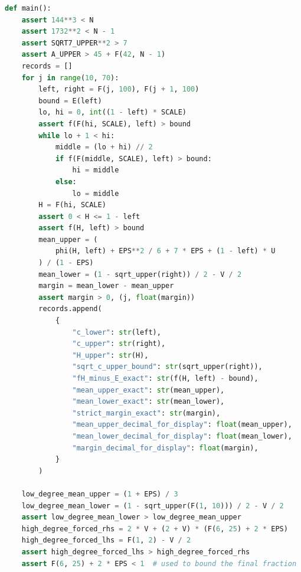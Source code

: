 \documentclass[11pt,a4paper]{article}
\theoremstyle{remark}
\numberwithin{equation}{section}
\begin{document}
\begin{lstlisting}[language=Python]
def main():
    assert 144**3 < N
    assert 1732**2 < N - 1
    assert SQRT7_UPPER**2 > 7
    assert A_UPPER > 45 + F(42, N - 1)
    records = []
    for j in range(10, 70):
        left, right = F(j, 100), F(j + 1, 100)
        bound = E(left)
        lo, hi = 0, int((1 - left) * SCALE)
        assert f(F(hi, SCALE), left) > bound
        while lo + 1 < hi:
            middle = (lo + hi) // 2
            if f(F(middle, SCALE), left) > bound:
                hi = middle
            else:
                lo = middle
        H = F(hi, SCALE)
        assert 0 < H <= 1 - left
        assert f(H, left) > bound
        mean_upper = (
            phi(H, left) + EPS**2 / 6 + 7 * EPS + (1 - left) * U
        ) / (1 - EPS)
        mean_lower = (1 - sqrt_upper(right)) / 2 - V / 2
        margin = mean_lower - mean_upper
        assert margin > 0, (j, float(margin))
        records.append(
            {
                "c_lower": str(left),
                "c_upper": str(right),
                "H_upper": str(H),
                "sqrt_c_upper_bound": str(sqrt_upper(right)),
                "fH_minus_E_exact": str(f(H, left) - bound),
                "mean_upper_exact": str(mean_upper),
                "mean_lower_exact": str(mean_lower),
                "strict_margin_exact": str(margin),
                "mean_upper_decimal_for_display": float(mean_upper),
                "mean_lower_decimal_for_display": float(mean_lower),
                "margin_decimal_for_display": float(margin),
            }
        )

    low_degree_mean_upper = (1 + EPS) / 3
    low_degree_mean_lower = (1 - sqrt_upper(F(1, 10))) / 2 - V / 2
    assert low_degree_mean_lower > low_degree_mean_upper
    high_degree_forced_rhs = 2 * V + (2 + V) * (F(6, 25) + 2 * EPS)
    high_degree_forced_lhs = F(1, 2) - V / 2
    assert high_degree_forced_lhs > high_degree_forced_rhs
    assert F(6, 25) + 2 * EPS < 1  # used to bound the final fraction


\end{lstlisting}
\end{document}
